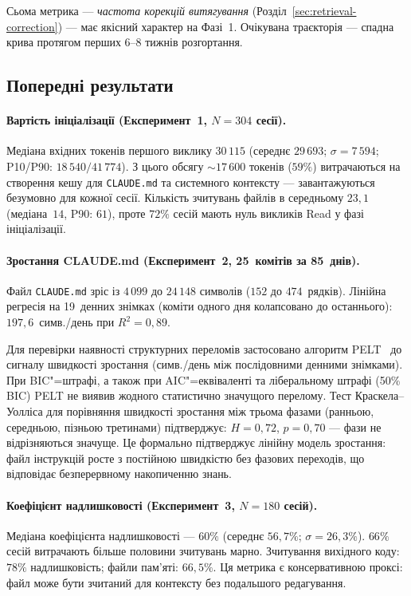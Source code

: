 \documentclass[11pt]{article}
\begin{document}
Сьома метрика --- \emph{частота корекцій витягування} (Розділ~\ref{sec:retrieval-correction}) --- має якісний характер на Фазі~1.
Очікувана траєкторія --- спадна крива протягом перших 6--8 тижнів розгортання.

\subsection{Попередні результати}
\label{sec:preliminary}

\paragraph{Вартість ініціалізації (Експеримент~1, $N{=}304$ сесії).}
Медіана вхідних токенів першого виклику $30\,115$ (середнє $29\,693$; $\sigma{=}7\,594$; P10/P90: $18\,540/41\,774$).
З цього обсягу ${\sim}17\,600$ токенів ($59\%$) витрачаються на створення кешу для \texttt{CLAUDE.md} та системного контексту --- завантажуються безумовно для кожної сесії.
Кількість зчитувань файлів в середньому $23{,}1$ (медіана~$14$, P90: $61$), проте $72\%$ сесій мають нуль викликів Read у фазі ініціалізації.

\paragraph{Зростання CLAUDE.md (Експеримент~2, 25~комітів за 85~днів).}
Файл \texttt{CLAUDE.md} зріс із $4\,099$ до $24\,148$ символів ($152$ до $474$~рядків).
Лінійна регресія на 19~денних знімках (коміти одного дня колапсовано до останнього): $197{,}6$~симв./день при $R^2 = 0{,}89$.

Для перевірки наявності структурних переломів застосовано алгоритм PELT~\citep{killick2012optimal} до сигналу швидкості зростання (симв./день між послідовними денними знімками).
При BIC"=штрафі, а також при AIC"=еквіваленті та ліберальному штрафі (50\% BIC) PELT не виявив жодного статистично значущого перелому.
Тест Краскела--Уолліса для порівняння швидкості зростання між трьома фазами (ранньою, середньою, пізньою третинами) підтверджує: $H{=}0{,}72$, $p{=}0{,}70$ --- фази не відрізняються значуще.
Це формально підтверджує лінійну модель зростання: файл інструкцій росте з постійною швидкістю без фазових переходів, що відповідає безперервному накопиченню знань.

\paragraph{Коефіцієнт надлишковості (Експеримент~3, $N{=}180$ сесій).}
Медіана коефіцієнта надлишковості --- $60\%$ (середнє $56{,}7\%$; $\sigma{=}26{,}3\%$).
$66\%$ сесій витрачають більше половини зчитувань марно.
Зчитування вихідного коду: $78\%$ надлишковість; файли пам'яті: $66{,}5\%$.
Ця метрика є консервативною проксі: файл може бути зчитаний для контексту без подальшого редагування.
\end{document}
